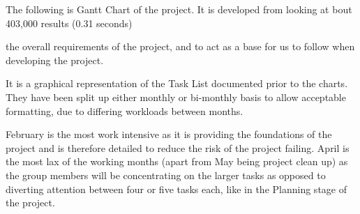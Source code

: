 The following is Gantt Chart of the project. It is developed from looking at bout 403,000 results (0.31 seconds) 

the overall requirements of the project, and to act as a base for us to follow 
when developing the project.

It is a graphical representation of the Task List documented prior to the 
charts.  They have been split up either monthly or bi-monthly basis to allow 
acceptable formatting, due to differing workloads between months.

February is the most work intensive as it is providing the foundations of the
project and is therefore detailed to reduce the risk of the project failing.
April is the most lax of the working months (apart from May being project
clean up) as the group members will be concentrating on the larger tasks as
opposed to diverting attention between four or five tasks each, like in the
Planning stage of the project.
\pagebreak

